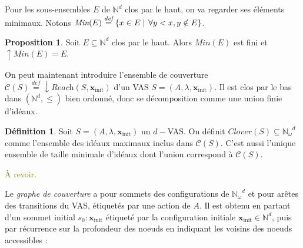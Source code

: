 \documentclass[a4paper,final]{article}
\theoremstyle{definition}
\newtheorem{Definition}[Theorem]{Définition}
\newtheorem{Proposition}[Theorem]{Proposition}
\let\leq\leqslant
\newcommand{\alain}[1]{\textcolor{blue}{#1}}
\newcommand{\lucas}[1]{\textcolor{olive}{#1}}
\newcommand{\set}[2]{\left\{#1\mathrel{\left|\vphantom{#1}\vphantom{#2}\right.}#2\right\}}
\newcommand{\defeq}{\ensuremath{\stackrel{\textit{def}}{=}}}
\newcommand{\Min}{\textit{Min}}
\newcommand{\N}{\ensuremath{\mathbb{N}}}
\newcommand{\Nomega}{\ensuremath{\mathbb{N}_\omega}}
\newcommand{\reach}{\ensuremath{\textit{Reach}}}
\newcommand{\cover}{\ensuremath{\mathcal{C}}}
\newcommand{\clover}{\textit{Clover}}
\newcommand{\vect}[1]{\ensuremath{\mathbf{#1}}}
\newcommand{\xinit}{\ensuremath{\vect{x}_\text{init}}}
\begin{document}
\vspace{5mm}
Pour les sous-ensembles $E$ de $\N^d$ clos par le haut, on va regarder ses éléments minimaux.
Notons $\Min(E) \defeq \set{x\in E}{\forall y < x, y \notin E}$.

\begin{Proposition}%
\label{clos_haut_wqo}
Soit $E\subseteq \N^d$ clos par le haut.
Alors $\Min(E)$ est fini et $\uparrow \Min(E) = E$.
\end{Proposition}

On peut maintenant introduire l'ensemble de couverture $\cover(S) \defeq \downarrow \reach(S,\xinit)$ d'un VAS $S = (A,\lambda,\xinit)$.
Il est clos par le bas dans $(\N^d,\leq)$ bien ordonné, donc se décomposition comme une union finie d'idéaux.


\begin{Definition}
Soit $S=(A,\lambda,\xinit)$ un $d-$VAS.
On définit $\clover(S) \subseteq \Nomega^d$ comme l'ensemble des idéaux maximaux inclus dans $\cover(S)$.
C'est aussi l'unique ensemble de taille minimale d'idéaux dont l'union correspond à $\cover(S)$.
\end{Definition}


\lucas{À revoir.}

Le \emph{graphe de couverture} a pour sommets des configurations de $\Nomega^d$ et pour arêtes des transitions du VAS, étiquetés par une action de $A$.
Il est obtenu en partant d'un sommet initial $s_0:\xinit$ étiqueté par la configuration initiale $\xinit\in \N^d$, puis par récurrence sur la profondeur des noeuds en indiquant les voisins des noeuds accessibles :
\end{document}
